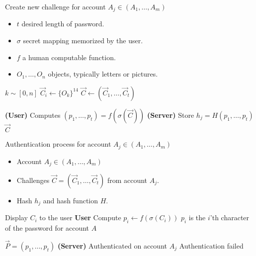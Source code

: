 \begin{algorithm}
    \caption{Create new challenge for account $A_j \in (A_1,\dots, A_m)$}
    \begin{algorithmic}[1]
        \Require
            \Statex \begin{itemize}
                \item $t$ desired length of password.
                \item $\sigma$ secret mapping memorized by the user.
                \item $f$ a human computable function.
                \item $O_1,\dots,O_n$ objects, typically letters or pictures.
            \end{itemize}
            
        
            \State $k \sim [0, n] $
            \State $\vec C_i \leftarrow \{O_k\}^{14} $
        \EndFor
        \Statex
        \State $\vec C \leftarrow (\vec C_1,\dots, \vec C_t) $

        \State \textbf{(User)} Computes $(p_1,\dots,p_t)=f(\sigma(\vec C))$
        \State \textbf{(Server)} Store $h_j = H(p_1,\dots,p_t)$
        \State
        \State \Return $\vec C$
    \end{algorithmic}
    \label{new-challenge-algo}
\end{algorithm}


\begin{algorithm}
    \caption{Authentication process for account $A_j \in (A_1,\dots,A_m)$}
    \begin{algorithmic}[1]
        \Require
            \Statex \begin{itemize}
                \item Account $A_j \in (A_1,\dots, A_m)$
                \item Challenges $\vec C = (\vec C_1,\dots,\vec C_t)$ from account $A_j$.
                \item Hash $h_j$ and hash function $H$.
            \end{itemize}

                \State Display $C_i$ to the user
                \State \textbf{User} Compute $p_i \leftarrow f(\sigma(C_i))$
                \State
                \Comment $p_i$ is the $i$'th character of the password for account $A$
            \EndFor

            \State $\vec P = (p_1,\dots,p_t)$
            \Comment \textbf{(Server)} 
                \State Authenticated on account $A_j$
            \Else 
                \State Authentication failed
            \EndIf

    \end{algorithmic}
    \label{auth-algo}
\end{algorithm}




